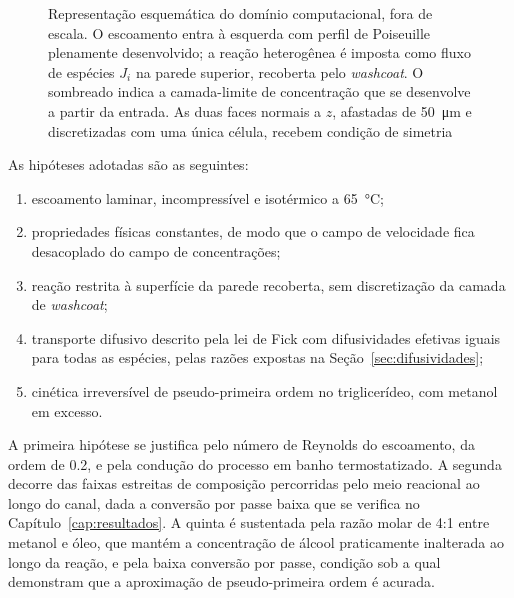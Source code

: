 \begin{figure}[htb]
\caption{Representação esquemática do domínio computacional, fora de escala.
O escoamento entra à esquerda com perfil de Poiseuille plenamente desenvolvido;
a reação heterogênea é imposta como fluxo de espécies $J_i$ na parede superior,
recoberta pelo \textit{washcoat}. O sombreado indica a camada-limite de
concentração que se desenvolve a partir da entrada. As duas faces normais a
$z$, afastadas de \SI{50}{\micro\meter} e discretizadas com uma única célula,
recebem condição de simetria}
\label{fig:dominio}
\end{figure}

As hipóteses adotadas são as seguintes:

\begin{enumerate}
\itemsep2pt
\item escoamento laminar, incompressível e isotérmico a \SI{65}{\celsius};
\item propriedades físicas constantes, de modo que o campo de velocidade fica
      desacoplado do campo de concentrações;
\item reação restrita à superfície da parede recoberta, sem discretização da
      camada de \textit{washcoat};
\item transporte difusivo descrito pela lei de Fick com difusividades efetivas
      iguais para todas as espécies, pelas razões expostas na
      Seção~\ref{sec:difusividades};
\item cinética irreversível de pseudo-primeira ordem no triglicerídeo, com
      metanol em excesso.
\end{enumerate}

A primeira hipótese se justifica pelo número de Reynolds do escoamento, da ordem
de \num{0.2}, e pela condução do processo em banho termostatizado. A segunda
decorre das faixas estreitas de composição percorridas pelo meio reacional ao
longo do canal, dada a conversão por passe baixa que se verifica no
Capítulo~\ref{cap:resultados}. A quinta é sustentada pela razão molar de
\num{4}:\num{1} entre metanol e óleo, que mantém a concentração de álcool
praticamente inalterada ao longo da reação, e pela baixa conversão por passe,
condição sob a qual \textcite{Ezzati2021} demonstram que a aproximação de
pseudo-primeira ordem é acurada.

